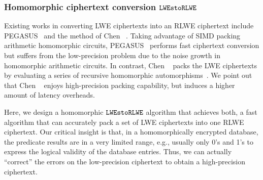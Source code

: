 \subsubsection{Homomorphic ciphertext conversion $\texttt{LWEstoRLWE}$}
Existing works in converting LWE ciphertexts into
an RLWE ciphertext
include PEGASUS~\cite{pegasus} and 
the method of Chen \etal~\cite{conversionhaochen}.
Taking advantage of SIMD packing arithmetic homomorphic circuits, 
PEGASUS~\cite{pegasus}
performs fast ciphertext conversion but suffers from the low-precision 
problem due to the noise growth in homomorphic arithmetic circuits.
In contrast, Chen \etal~\cite{conversionhaochen} packs the
LWE ciphertexts by evaluating a series of
recursive homomorphic automorphisms~\cite{helib}.
We point out that Chen \etal~\cite{conversionhaochen}
enjoys high-precision packing capability, but 
induces a higher amount of latency overheads.

Here, we design a homomorphic $\texttt{LWEstoRLWE}$ algorithm that
achieves both, a fast algorithm that can accurately
pack a set of LWE ciphertexts into one RLWE ciphertext.
Our critical insight is that, in a homomorphically encrypted database, 
the predicate results are in a very limited range, e.g., usually only
0's and 1's to express the logical validity of the database entries.
Thus, we can actually ``correct'' the errors on the low-precision ciphertext to 
obtain a high-precision ciphertext. 



